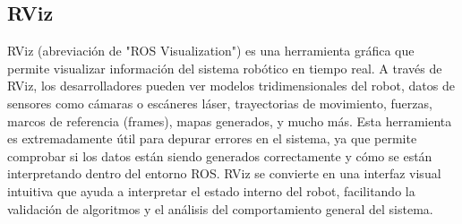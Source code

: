 \subsection{RViz}
RViz (abreviación de "ROS Visualization") es una herramienta gráfica que permite visualizar información del sistema robótico en tiempo real. A través de RViz, los desarrolladores pueden ver modelos tridimensionales del robot, datos de sensores como cámaras o escáneres láser, trayectorias de movimiento, fuerzas, marcos de referencia (frames), mapas generados, y mucho más. Esta herramienta es extremadamente útil para depurar errores en el sistema, ya que permite comprobar si los datos están siendo generados correctamente y cómo se están interpretando dentro del entorno ROS. RViz se convierte en una interfaz visual intuitiva que ayuda a interpretar el estado interno del robot, facilitando la validación de algoritmos y el análisis del comportamiento general del sistema.
